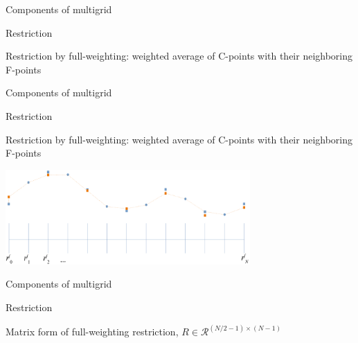\documentclass[18pt,xcolor=table]{beamer}
\begin{document}
\begin{frame}{Components of multigrid}
\begin{block}{Restriction}
\bit
\item Restriction by full-weighting: weighted average of C-points with their neighboring F-points
\eit
{}
\end{block}
\end{frame}

\begin{frame}{Components of multigrid}
\begin{block}{Restriction}
\bit
\item Restriction by full-weighting: weighted average of C-points with their neighboring F-points
\eit
\end{block}
\begin{center}
\includegraphics[width=0.7\textwidth]{../figures/fullWeightingResidual}
\end{center}
\end{frame}


\begin{frame}{Components of multigrid}
\begin{block}{Restriction}
\bit
\item Matrix form of full-weighting restriction, $R\in\mathcal{R}^{(N/2-1)\times(N-1)}$
\eit
{}
\end{block}
\end{frame}
\end{document}
